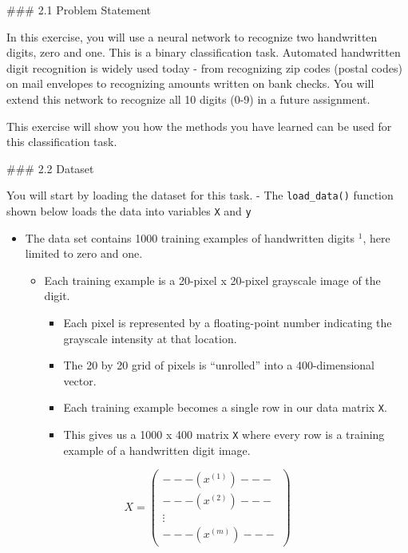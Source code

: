 \documentclass[11pt]{article}
\providecommand{\tightlist}{%
      \setlength{\itemsep}{0pt}\setlength{\parskip}{0pt}}
\begin{document}
\#\#\# 2.1 Problem Statement

In this exercise, you will use a neural network to recognize two
handwritten digits, zero and one. This is a binary classification task.
Automated handwritten digit recognition is widely used today - from
recognizing zip codes (postal codes) on mail envelopes to recognizing
amounts written on bank checks. You will extend this network to
recognize all 10 digits (0-9) in a future assignment.

This exercise will show you how the methods you have learned can be used
for this classification task.

\#\#\# 2.2 Dataset

You will start by loading the dataset for this task. - The
\texttt{load\_data()} function shown below loads the data into variables
\texttt{X} and \texttt{y}

\begin{itemize}
\item
  The data set contains 1000 training examples of handwritten digits
  \(^1\), here limited to zero and one.

  \begin{itemize}
  \tightlist
  \item
    Each training example is a 20-pixel x 20-pixel grayscale image of
    the digit.

    \begin{itemize}
    \tightlist
    \item
      Each pixel is represented by a floating-point number indicating
      the grayscale intensity at that location.
    \item
      The 20 by 20 grid of pixels is ``unrolled'' into a 400-dimensional
      vector.
    \item
      Each training example becomes a single row in our data matrix
      \texttt{X}.
    \item
      This gives us a 1000 x 400 matrix \texttt{X} where every row is a
      training example of a handwritten digit image.
    \end{itemize}
  \end{itemize}
\end{itemize}

\[X = 
\left(\begin{array}{cc} 
--- (x^{(1)}) --- \\
--- (x^{(2)}) --- \\
\vdots \\ 
--- (x^{(m)}) --- 
\end{array}\right)\]
\end{document}
